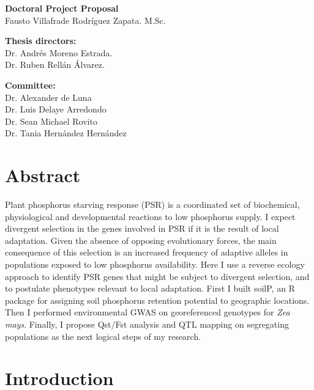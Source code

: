 \documentclass[10pt,letterpaper]{article}
\begin{document}
\vspace*{0.35in}

\begin{flushleft}
{\Large
\textbf{
}
}
\bigskip

\textbf{Doctoral Project Proposal} \\
Fausto Villafrade Rodríguez Zapata. M.Sc. 
\bigskip

\textbf{Thesis directors:} \\
Dr. Andrés Moreno Estrada.\\
Dr. Ruben Rellán Álvarez.

\bigskip
\textbf{Committee:}\\
Dr. Alexander de Luna \\
Dr. Luis Delaye Arredondo \\
Dr. Sean Michael Rovito  \\
Dr. Tania Hernández Hernández
\end{flushleft}

\section*{Abstract}
Plant phosphorus starving response (PSR) is a coordinated set of biochemical, physiological and developmental reactions to low phosphorus supply. I expect divergent selection in the genes involved in PSR if it is the result of local adaptation. Given the absence of opposing evolutionary forces, the main consequence of this selection is an increased frequency of adaptive alleles in populations exposed to low phosphorus availability. Here I use a reverse ecology approach to identify PSR genes that might be subject to divergent selection, and to postulate phenotypes relevant to local adaptation. First I built soilP, an R package for assigning soil phosphorus retention potential to geographic locations. Then I performed environmental GWAS on georeferenced genotypes for \textit{Zea mays}. Finally, I propose Qst/Fst analysis and QTL mapping on segregating populations as the next logical steps of my research.


\linenumbers

\section*{Introduction}
\end{document}
